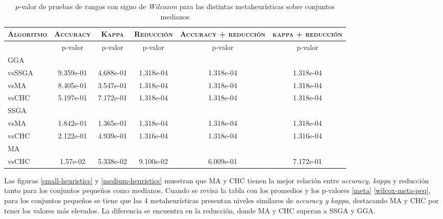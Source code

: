 \begin{table}[h!]
\centering
\begin{adjustbox}{max width =\textwidth}
\begin{tabular}{l c c c c c}
\hline
	\textsc{Algoritmo}
	& \multicolumn{1}{c}{\textsc{Accuracy}}
	& \multicolumn{1}{c}{\textsc{Kappa}}
	& \multicolumn{1}{c}{\textsc{Reducción}} 
	& \multicolumn{1}{c}{\textsc{Accuracy + reducción}} 
	& \multicolumn{1}{c}{\textsc{kappa + reducción}} \\
\hline
\hline

 & p-valor & p-valor & p-valor & p-valor & p-valor \\

GGA \\
vsSSGA & 9.359e-01 & 4.688e-01 & 1.318e-04 & 1.318e-04 & 1.318e-04 \\
vsMA & 8.405e-01 & 3.547e-01 & 1.318e-04 & 1.318e-04 & 1.318e-04 \\
vsCHC & 5.197e-01 & 7.172e-01 & 1.318e-04 & 1.318e-04 & 1.318e-04 \\

\hline

SSGA \\
vsMA & 1.842e-01 & 1.365e-01 & 1.318e-04 & 1.318e-04 & 1.318e-04 \\
vsCHC & 2.122e-01 & 4.939e-01 & 1.316e-04 & 1.318e-04 & 1.316e-04 \\

\hline

MA \\
vsCHC & 1.57e-02 & 5.338e-02 & 9.100e-02 & 6.009e-01 & 7.172e-01 \\ 

\hline


\end{tabular}
\end{adjustbox}
\caption[Pruebas de \emph{Wilcoxon} entre las metaheurísticas para conjuntos pequeños]{$p$-valor de pruebas de rangos con signo de \emph{Wilcoxon} para las distintas metaheurísticas sobre conjuntos medianos}
\label{wilcox-meta-med}
\end{table}


Las figuras \ref{small-heuristics} y \ref{medium-heuristics} muestran que MA y CHC tienen la mejor relación entre \emph{accuracy, kappa} y reducción tanto para los conjuntos pequeños como medianos. Cuando se revisa la tabla con los promedios y los p-valores \ref{meta} \ref{wilcox-meta-peq}, para los conjuntos pequeños se tiene que las 4 metaheurísticas presentan niveles similares de \emph{accuracy y kappa}, destacando MA y CHC por tener los valores más elevados. La diferencia se encuentra en la reducción, donde MA y CHC superan a SSGA y GGA.

